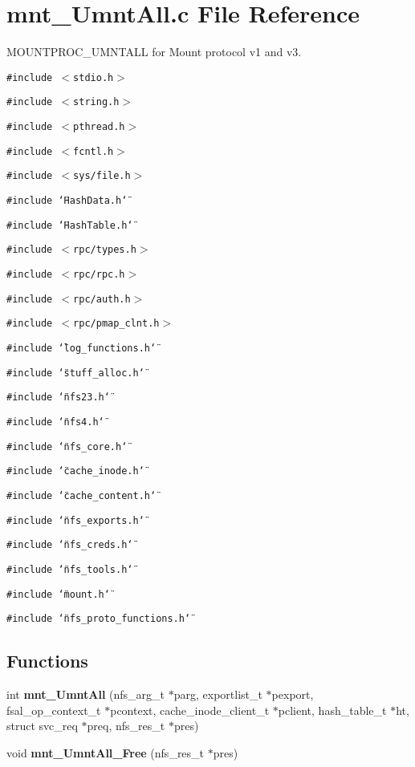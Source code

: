 \section{mnt\_\-UmntAll.c File Reference}
\label{mnt__UmntAll_8c}
MOUNTPROC\_\-UMNTALL for Mount protocol v1 and v3.  


{\tt \#include $<$stdio.h$>$}\par
{\tt \#include $<$string.h$>$}\par
{\tt \#include $<$pthread.h$>$}\par
{\tt \#include $<$fcntl.h$>$}\par
{\tt \#include $<$sys/file.h$>$}\par
{\tt \#include \char`\"{}HashData.h\char`\"{}}\par
{\tt \#include \char`\"{}HashTable.h\char`\"{}}\par
{\tt \#include $<$rpc/types.h$>$}\par
{\tt \#include $<$rpc/rpc.h$>$}\par
{\tt \#include $<$rpc/auth.h$>$}\par
{\tt \#include $<$rpc/pmap\_\-clnt.h$>$}\par
{\tt \#include \char`\"{}log\_\-functions.h\char`\"{}}\par
{\tt \#include \char`\"{}stuff\_\-alloc.h\char`\"{}}\par
{\tt \#include \char`\"{}nfs23.h\char`\"{}}\par
{\tt \#include \char`\"{}nfs4.h\char`\"{}}\par
{\tt \#include \char`\"{}nfs\_\-core.h\char`\"{}}\par
{\tt \#include \char`\"{}cache\_\-inode.h\char`\"{}}\par
{\tt \#include \char`\"{}cache\_\-content.h\char`\"{}}\par
{\tt \#include \char`\"{}nfs\_\-exports.h\char`\"{}}\par
{\tt \#include \char`\"{}nfs\_\-creds.h\char`\"{}}\par
{\tt \#include \char`\"{}nfs\_\-tools.h\char`\"{}}\par
{\tt \#include \char`\"{}mount.h\char`\"{}}\par
{\tt \#include \char`\"{}nfs\_\-proto\_\-functions.h\char`\"{}}\par
\subsection*{Functions}
\begin{CompactItemize}
\item 
int {\bf mnt\_\-UmntAll} (nfs\_\-arg\_\-t $\ast$parg, exportlist\_\-t $\ast$pexport, fsal\_\-op\_\-context\_\-t $\ast$pcontext, cache\_\-inode\_\-client\_\-t $\ast$pclient, hash\_\-table\_\-t $\ast$ht, struct svc\_\-req $\ast$preq, nfs\_\-res\_\-t $\ast$pres)
\item 
void {\bf mnt\_\-UmntAll\_\-Free} (nfs\_\-res\_\-t $\ast$pres)
\end{CompactItemize}


